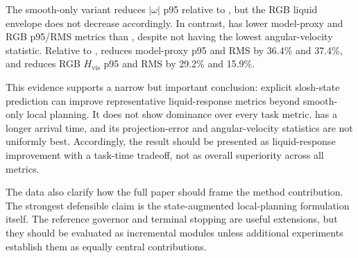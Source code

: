 The smooth-only variant reduces $|\omega|$ p95 relative to \Bzero{}, but the RGB liquid envelope does not decrease accordingly.
In contrast, \Bslosh{} has lower model-proxy and RGB p95/RMS metrics than \Bsmooth{}, despite not having the lowest angular-velocity statistic.
Relative to \Bsmooth{}, \Bslosh{} reduces model-proxy p95 and RMS by 36.4\% and 37.4\%, and reduces RGB $H_{\mathrm{vis}}$ p95 and RMS by 29.2\% and 15.9\%.

This evidence supports a narrow but important conclusion: explicit slosh-state prediction can improve representative liquid-response metrics beyond smooth-only local planning.
It does not show dominance over every task metric.
\Bslosh{} has a longer arrival time, and its projection-error and angular-velocity statistics are not uniformly best.
Accordingly, the result should be presented as liquid-response improvement with a task-time tradeoff, not as overall superiority across all metrics.

The data also clarify how the full paper should frame the method contribution.
The strongest defensible claim is the state-augmented local-planning formulation itself.
The reference governor and terminal stopping are useful extensions, but they should be evaluated as incremental modules unless additional experiments establish them as equally central contributions.
